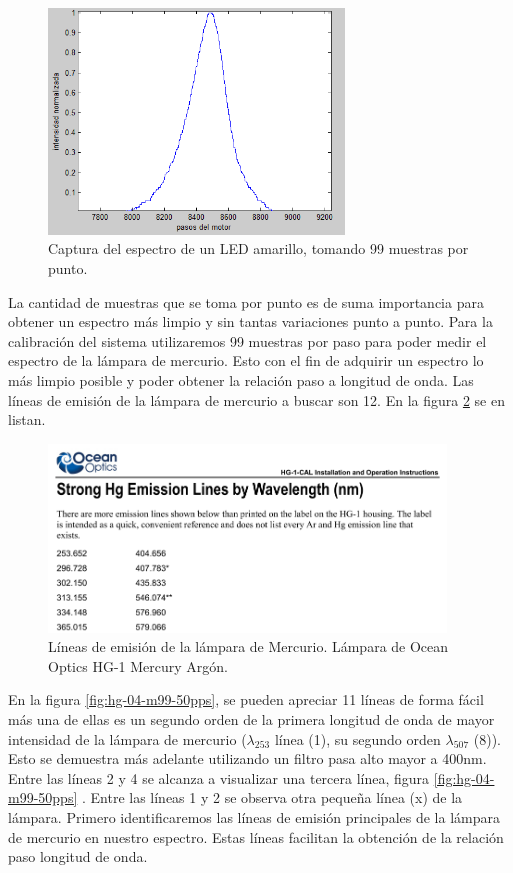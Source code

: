 \begin{figure}[h]
	\centering
	\includegraphics[width=0.9\linewidth,height=6cm]{Imagenes/3/LED99Muestras}
	\caption[Espectro de un LED amarillo.]{Captura del espectro de un LED amarillo, tomando 99 muestras por punto.}
	\label{fig:led99muestras}
\end{figure}
La cantidad de muestras que se toma por punto es de suma importancia para obtener un espectro más limpio y sin tantas variaciones punto a punto.
Para la calibración del sistema utilizaremos 99 muestras por paso para poder medir el espectro de la lámpara de mercurio. Esto con el fin de adquirir un espectro lo más limpio posible y poder obtener la relación paso a longitud de onda. Las líneas de emisión de la lámpara de mercurio a buscar son 12. En la figura \ref{fig:mercuriolineas} se en listan.
\begin{figure}[h]
	\centering
	\includegraphics[width=0.8\linewidth,height=5cm]{Imagenes/3/Mercuriolineas}
	\caption{Líneas de emisión de la lámpara de Mercurio. Lámpara de Ocean Optics HG-1 Mercury Argón. \cite{Excel2000}}
	\label{fig:mercuriolineas}
\end{figure}

En la figura \ref{fig:hg-04-m99-50pps}, se pueden apreciar 11 líneas de forma fácil más una de ellas es un segundo orden de la primera longitud de onda de mayor intensidad de la lámpara de mercurio ($\lambda_{253}$ línea (1), su segundo orden $\lambda_{507}$ (8)). Esto se demuestra más adelante utilizando un filtro pasa alto mayor a 400nm. Entre las líneas 2 y 4 se alcanza a visualizar una tercera línea, figura \ref{fig:hg-04-m99-50pps} . Entre las líneas 1 y 2 se observa otra pequeña línea (x) de la lámpara. Primero identificaremos las líneas de emisión principales de la lámpara de mercurio en nuestro espectro. Estas líneas facilitan la obtención de la relación paso longitud de onda.

